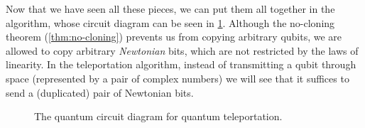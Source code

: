 Now that we have seen all these pieces, we can put them all together in the
 algorithm, whose circuit diagram can be seen in
\cref{qcd:teleportation}.  Although the no-cloning theorem
(\cref{thm:no-cloning}) prevents us from copying arbitrary qubits,
we are allowed to copy arbitrary \emph{Newtonian} bits, which are not
restricted by the laws of linearity.
In the teleportation algorithm, instead of transmitting a qubit
through space (represented by a pair
of complex numbers) we will see that it suffices to send a (duplicated) pair of 
Newtonian bits.

\begin{figure}
  \centerline{}
  \caption{The quantum circuit diagram for quantum teleportation.}
  \label{qcd:teleportation}
\end{figure}

